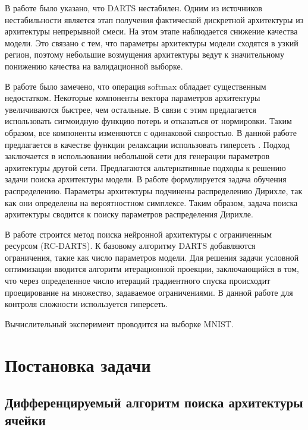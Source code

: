 \documentclass[12pt, twoside]{article}
\begin{document}
В работе \cite{journals/corr/abs-2002-05283} было указано, что DARTS нестабилен. Одним из источников нестабильности является этап получения фактической дискретной архитектуры из архитектуры непрерывной смеси. На этом этапе наблюдается снижение качества модели. Это связано с тем, что параметры архитектуры модели сходятся в узкий регион, поэтому  небольшие возмущения архитектуры ведут к значительному понижению качества на валидационной выборке. 

В работе \cite{journals/corr/abs-1911-12126} было замечено, что операция $\text{softmax}$ обладает существенным недостатком. Некоторые компоненты вектора параметров архитектуры увеличиваются быстрее, чем остальные. В связи с этим предлагается использовать сигмоидную  функцию потерь и отказаться от нормировки. Таким образом, все компоненты изменяются с одинаковой скоростью. В данной работе предлагается в качестве функции релаксации использовать гиперсеть \cite{journals/corr/HaDL16}. Подход заключается в использовании небольшой сети для генерации параметров архитектуры другой сети.
 Предлагаются альтернативные подходы к решению задачи поиска архитектуры модели. В работе \cite{journals/corr/abs-2006-10355} формулируется задача обучения распределению. Параметры архитектуры подчинены распределению Дирихле, так как они определены на вероятностном симплексе. Таким образом, задача поиска архитектуры сводится к поиску параметров распределения Дирихле.

В работе \cite{journals/corr/abs-1912-12814} строится метод поиска нейронной архитектуры с ограниченным ресурсом (RC-DARTS). К базовому алгоритму DARTS добавляются ограничения, такие как число параметров модели. Для решения задачи условной оптимизации вводится алгоритм итерационной проекции, заключающийся в том, что через определенное число итераций градиентного спуска происходит проецирование на множество, задаваемое ограничениями. В данной работе для контроля сложности используется гиперсеть.


Вычислительный эксперимент проводится на выборке MNIST\cite{lecun-mnisthandwrittendigit-2010}.

\section{Постановка задачи}

\subsection{Дифференцируемый алгоритм поиска архитектуры ячейки}
\end{document}
